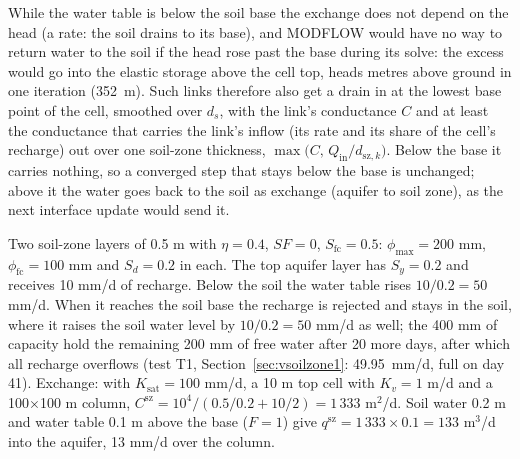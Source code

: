 While the water table is below the soil base the exchange does not depend on the head (a rate: the soil drains to its
base), and MODFLOW would have no way to return water to the soil if the head rose past the base during its solve: the
excess would go into the elastic storage above the cell top, heads metres above ground in one iteration (352~m). Such links therefore also get a drain in  at the lowest base point of the cell, smoothed
over $d_s$, with the link's conductance $C$ and at least the conductance that carries the link's inflow (its rate and
its share of the cell's recharge) out over one soil-zone thickness, $\max\big(C,\,Q_{\mathrm{in}}/d_{\mathrm{sz},k}\big)$. Below the
base it carries nothing, so a converged step that stays below the base is unchanged; above it the water goes back to
the soil as exchange (aquifer to soil zone), as the next interface update would send it.

\begin{example}
Two soil-zone layers of 0.5 m with $\eta=0.4$, $\mathit{SF}=0$, $S_{\mathrm{fc}}=0.5$: $\phi_{\max}=200$ mm, $\phi_{\mathrm{fc}}=100$ mm and
$S_d=0.2$ in each. The top aquifer layer has $S_y=0.2$ and receives 10 mm/d of recharge. Below the soil the water table
rises $10/0.2=50$ mm/d. When it reaches the soil base the recharge is rejected and stays in the soil, where it raises
the soil water level by $10/0.2=50$ mm/d as well; the 400 mm of capacity hold the remaining 200 mm of free water after 20
more days, after which all recharge overflows (test T1, Section~\ref{sec:vsoilzone1}: 49.95~mm/d, full on day 41). Exchange: with
$K_{\mathrm{sat}}=100$ mm/d, a 10 m top cell with $K_v=1$ m/d and a 100$\times$100 m column,
$C^{\mathrm{sz}}=10^4/(0.5/0.2+10/2)=1\,333$ m$^2$/d. Soil water 0.2 m and water table 0.1 m above the base ($F=1$) give
$q^{\mathrm{sz}}=1\,333\times0.1=133$ m$^3$/d into the aquifer, 13 mm/d over the column.
\end{example}

